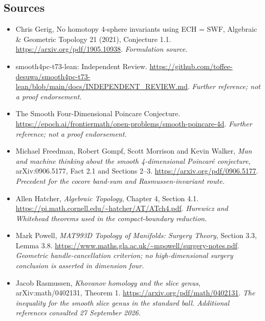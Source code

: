 \documentclass[11pt]{article}
\begin{document}
\subsection{Sources}
\begin{itemize}
\item[S1]Chris Gerig, No homotopy 4-sphere invariants using ECH = SWF, Algebraic \& Geometric Topology 21 (2021), Conjecture 1.1.
\url{https://arxiv.org/pdf/1905.10938}.
\textit{Formulation source.}
\item[S2]smooth4pc-t73-lean: Independent Review.
\url{https://github.com/toffee-desuwa/smooth4pc-t73-lean/blob/main/docs/INDEPENDENT_REVIEW.md}.
\textit{Further reference; not a proof endorsement.}
\item[S3]The Smooth Four-Dimensional Poincare Conjecture.
\url{https://epoch.ai/frontiermath/open-problems/smooth-poincare-4d}.
\textit{Further reference; not a proof endorsement.}
\item[E1]Michael Freedman, Robert Gompf, Scott Morrison and Kevin Walker,
\emph{Man and machine thinking about the smooth 4-dimensional Poincar\'e
conjecture}, arXiv:0906.5177, Fact 2.1 and Sections 2--3.
\url{https://arxiv.org/pdf/0906.5177}.
\textit{Precedent for the cocore band-sum and Rasmussen-invariant route.}
\item[E2]Allen Hatcher, \emph{Algebraic Topology}, Chapter 4, Section 4.1.
\url{https://pi.math.cornell.edu/~hatcher/AT/ATch4.pdf}.
\textit{Hurewicz and Whitehead theorems used in the compact-boundary reduction.}
\item[E3]Mark Powell, \emph{MAT993D Topology of Manifolds: Surgery Theory},
Section 3.3, Lemma 3.8.
\url{https://www.maths.gla.ac.uk/~mpowell/surgery-notes.pdf}.
\textit{Geometric handle-cancellation criterion; no high-dimensional
surgery conclusion is asserted in dimension four.}
\item[E4]Jacob Rasmussen, \emph{Khovanov homology and the slice genus},
arXiv:math/0402131, Theorem 1.
\url{https://arxiv.org/pdf/math/0402131}.
\textit{The inequality for the smooth slice genus in the standard ball.
Additional references consulted 27 September 2026.}
\end{itemize}
\end{document}
